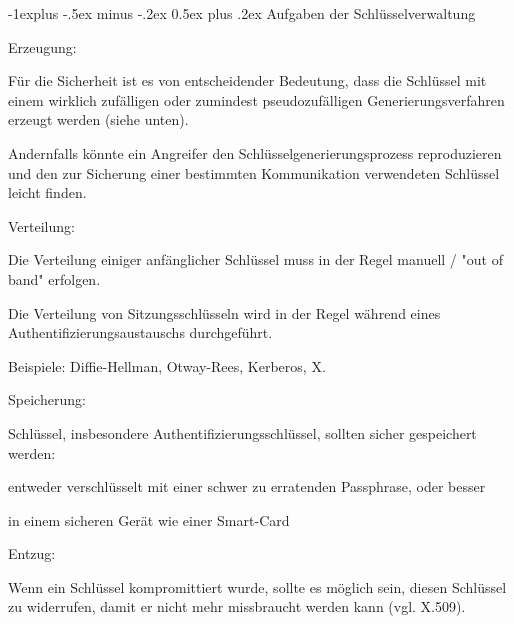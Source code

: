 \documentclass[a4paper]{article}
\makeatletter
\renewcommand{\subsection}{\@startsection{subsection}{2}{0mm}%
 {-1explus -.5ex minus -.2ex}%
 {0.5ex plus .2ex}%
 {\normalfont\normalsize\bfseries}}
\makeatother
\begin{document}
\begin{multicols}{3}
      \subsection{Aufgaben der Schlüsselverwaltung}
      \begin{itemize*}
            \item Erzeugung:
            \begin{itemize*}
                  \item Für die Sicherheit ist es von entscheidender Bedeutung, dass die Schlüssel mit einem wirklich zufälligen oder zumindest pseudozufälligen Generierungsverfahren erzeugt werden (siehe unten).
                  \item Andernfalls könnte ein Angreifer den Schlüsselgenerierungsprozess reproduzieren und den zur Sicherung einer bestimmten Kommunikation verwendeten Schlüssel leicht finden.
            \end{itemize*}
            \item Verteilung:
            \begin{itemize*}
                  \item Die Verteilung einiger anfänglicher Schlüssel muss in der Regel manuell / "out of band" erfolgen.
                  \item Die Verteilung von Sitzungsschlüsseln wird in der Regel während eines Authentifizierungsaustauschs durchgeführt.
                  \item Beispiele: Diffie-Hellman, Otway-Rees, Kerberos, X.
            \end{itemize*}
            \item Speicherung:
            \begin{itemize*}
                  \item Schlüssel, insbesondere Authentifizierungsschlüssel, sollten sicher gespeichert werden:
                  \begin{itemize*} \item entweder verschlüsselt mit einer schwer zu erratenden Passphrase, oder besser \item in einem sicheren Gerät wie einer Smart-Card \end{itemize*}
            \end{itemize*}
            \item Entzug:
            \begin{itemize*}
                  \item Wenn ein Schlüssel kompromittiert wurde, sollte es möglich sein, diesen Schlüssel zu widerrufen, damit er nicht mehr missbraucht werden kann (vgl. X.509).

\end{itemize*}
\end{itemize*}
\end{multicols}
\end{document}
